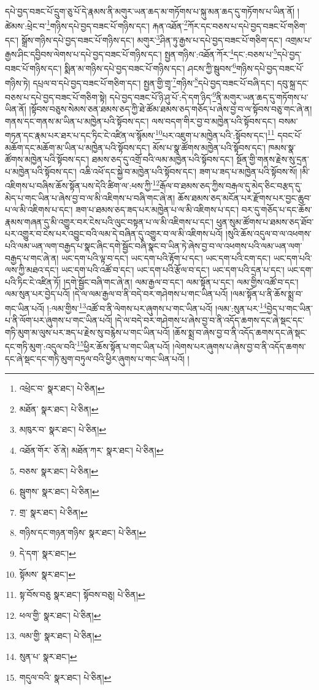 དཔེ་བྱད་བཟང་པོ་དྲུག་ཅུ་པོ་དེ་རྣམས་ནི་མགུར་ཡན་ཆད་མ་གཏོགས་པ་སྐུ་མན་ཆད་དུ་གཏོགས་པ་ཡིན་ནོ། །ཚེམས་:ཕྲེང་བ་\footnote{འཕྲེང་བ་  སྣར་ཐང་།  པེ་ཅིན། }གཉིས་དཔེ་བྱད་བཟང་པོ་གཉིས་དང་། རྐན་འཐོན་\footnote{མཐོན་  སྣར་ཐང་།  པེ་ཅིན། }ཀོར་དང་བཅས་པ་དཔེ་བྱད་བཟང་པོ་གཅིག་དང་། སྒྲོས་གཉིས་དཔེ་བྱད་བཟང་པོ་གཉིས་དང་། མགུར་\footnote{མཁུར་བ་  སྣར་ཐང་།  པེ་ཅིན། }ཤིན་ཏུ་རྒྱས་པ་དཔེ་བྱད་བཟང་པོ་གཅིག་དང་། འགྲམ་པ་རྒྱས་ཤིང་དབྱིབས་ལེགས་པ་དཔེ་བྱད་བཟང་པོ་གཉིས་དང་། སྤྱན་གཉིས་:འཐོན་ཀོར་\footnote{འཐོན་གོར་  ཅོ་ནེ། མཐོན་ཀར་  སྣར་ཐང་།  པེ་ཅིན། }དང་:བཅས་པ་\footnote{བཅས་  སྣར་ཐང་།  པེ་ཅིན། }དཔེ་བྱད་བཟང་པོ་གཉིས་དང་། སྨིན་མ་གཉིས་དཔེ་བྱད་བཟང་པོ་གཉིས་དང་། ཤངས་ཀྱི་སྦུབས་\footnote{སྦུགས་  སྣར་ཐང་།  པེ་ཅིན། }གཉིས་དཔེ་བྱད་བཟང་པོ་གཉིས་ཏེ། དཔྲལ་བ་དཔེ་བྱད་བཟང་པོ་གཅིག་དང་། སྤྱན་གྱི་གྲྭ་\footnote{གྲ་  སྣར་ཐང་།  པེ་ཅིན། }གཉིས་\footnote{གཉིས་དང་གཉན་གཉིས་  སྣར་ཐང་།  པེ་ཅིན། }དཔེ་བྱད་བཟང་པོ་བཞི་དང་། དབུ་སྐྲ་དང་བཅས་པ་དཔེ་བྱད་བཟང་པོ་གཅིག་སྟེ། དཔེ་བྱད་བཟང་པོ་ཉི་ཤུ་པོ་:དེ་དག་ཉིད་\footnote{དེ་དག་  སྣར་ཐང་། }ནི་མགུར་ཡན་ཆད་དུ་གཏོགས་པ་ཡིན་ནོ། །སྟོབས་བཅུས་སེམས་ཅན་ཐམས་ཅད་ཀྱི་ཐེ་ཚོམ་ཐམས་ཅད་གཅོད་པ་ཞེས་བྱ་བ་ལ་སྟོབས་བཅུ་གང་ཞེ་ན། གནས་དང་གནས་མ་ཡིན་པ་མཁྱེན་པའི་སྟོབས་དང་། ལས་བདག་གིར་བྱ་བ་མཁྱེན་པའི་སྟོབས་དང་། བསམ་གཏན་དང་རྣམ་པར་ཐར་པ་དང་ཏིང་ངེ་འཛིན་ལ་སྙོམས་\footnote{སྟོམས་  སྣར་ཐང་། }པར་འཇུག་པ་མཁྱེན་པའི་:སྟོབས་དང་།\footnote{སྟ་བོས་བཅུ  སྣར་ཐང་། སྟོབས་བཅུ།  པེ་ཅིན། } དབང་པོ་མཆོག་དང་མཆོག་མ་ཡིན་པ་མཁྱེན་པའི་སྟོབས་དང་། མོས་པ་སྣ་ཚོགས་མཁྱེན་པའི་སྟོབས་དང་། ཁམས་སྣ་ཚོགས་མཁྱེན་པའི་སྟོབས་དང་། ཐམས་ཅད་དུ་འགྲོ་བའི་ལམ་མཁྱེན་པའི་སྟོབས་དང་། སྔོན་གྱི་གནས་རྗེས་སུ་དྲན་པ་མཁྱེན་པའི་སྟོབས་དང་། འཆི་འཕོ་དང་སྐྱེ་བ་མཁྱེན་པའི་སྟོབས་དང་། ཟག་པ་ཟད་པ་མཁྱེན་པའི་སྟོབས་སོ། །མི་འཇིགས་པ་བཞིས་ཆོས་སྟོན་པས་དེའི་ཚིག་ལ་:ཕས་ཀྱི་\footnote{ཕལ་གྱི་  སྣར་ཐང་།  པེ་ཅིན། }རྒོལ་བ་ཐམས་ཅད་ཀྱིས་བརྒལ་དུ་མེད་ཅིང་བརྩད་དུ་མེད་པ་གང་ཡིན་པ་ཞེས་བྱ་བ་ལ་མི་འཇིགས་པ་བཞི་གང་ཞེ་ན། ཆོས་ཐམས་ཅད་མངོན་པར་རྫོགས་པར་བྱང་ཆུབ་པ་ལ་མི་འཇིགས་པ་དང་། ཟག་པ་ཐམས་ཅད་ཟད་པར་མཁྱེན་པ་ལ་མི་འཇིགས་པ་དང་། བར་དུ་གཅོད་པ་དང་ཆོས་རྣམས་གཞན་དུ་མི་འགྱུར་བར་ངེས་པའི་ལུང་བསྟན་པ་ལ་མི་འཇིགས་པ་དང་། ཕུན་སུམ་ཚོགས་པ་ཐམས་ཅད་ཐོབ་པར་འགྱུར་བ་ངེས་པར་འབྱུང་བའི་ལམ་དེ་བཞིན་དུ་འགྱུར་བ་ལ་མི་འཇིགས་པའོ། །སུའི་ཆོས་འདུལ་བ་ལ་འཕགས་པའི་ལམ་ཡན་ལག་བརྒྱད་པ་སྣང་ཞིང་དགེ་སྦྱོང་བཞི་སྣང་བ་ཡིན་ཏེ་ཞེས་བྱ་བ་ལ་འཕགས་པའི་ལམ་ཡན་ལག་བརྒྱད་པ་གང་ཞེ་ན། ཡང་དག་པའི་ལྟ་བ་དང་། ཡང་དག་པའི་རྟོག་པ་དང་། ཡང་དག་པའི་ངག་དང་། ཡང་དག་པའི་ལས་ཀྱི་མཐའ་དང་། ཡང་དག་པའི་འཚོ་བ་དང་། ཡང་དག་པའི་རྩོལ་བ་དང་། ཡང་དག་པའི་དྲན་པ་དང་། ཡང་དག་པའི་ཏིང་ངེ་འཛིན་ཏོ། །དགེ་སྦྱོང་བཞི་གང་ཞེ་ན། ལམ་རྒྱལ་བ་དང་། ལམ་སྟོན་པ་དང་། ལམ་གྱིས་འཚོ་བ་དང་། ལམ་སུན་པར་བྱེད་པའོ། །དེ་ལ་ལམ་རྒྱལ་བ་ནི་བདེ་བར་གཤེགས་པ་གང་ཡིན་པའོ། །ལམ་སྟོན་པ་ནི་ཆོས་སྨྲ་བ་གང་ཡིན་པའོ། །:ལམ་གྱིས་\footnote{ལམ་གྱི་  སྣར་ཐང་།  པེ་ཅིན། }འཚོ་བ་ནི་ལེགས་པར་ཞུགས་པ་གང་ཡིན་པའོ། །ལམ་:སུན་པར་\footnote{སུན་པ་  སྣར་ཐང་། }བྱེད་པ་གང་ཡིན་པ་ནི་ལོག་པར་ཞུགས་པ་གང་ཡིན་པའོ། །དེ་ལ་བདེ་བར་གཤེགས་པ་ཞེས་བྱ་བ་ནི་འདོད་ཆགས་དང་ཞེ་སྡང་དང་གཏི་མུག་མ་ལུས་པར་ཟད་པ་རྗེས་སུ་བརྙེས་པ་གང་ཡིན་པའོ། །ཆོས་སྨྲ་བ་ཞེས་བྱ་བ་ནི་འདོད་ཆགས་དང་ཞེ་སྡང་དང་གཏི་མུག་:འདུལ་བའི་\footnote{གདུལ་བའི་  སྣར་ཐང་།  པེ་ཅིན། }ཕྱིར་ཆོས་སྟོན་པ་གང་ཡིན་པའོ། །ལེགས་པར་ཞུགས་པ་ཞེས་བྱ་བ་ནི་འདོད་ཆགས་དང་ཞེ་སྡང་དང་གཏི་མུག་བཏུལ་བའི་ཕྱིར་ཞུགས་པ་གང་ཡིན་པའོ། །
